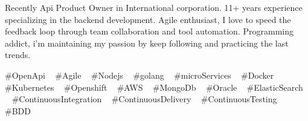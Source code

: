 

\begin{cvparagraph}

Recently Api Product Owner in International corporation. 11+ years experience specializing in the backend development. Agile enthusiast, I love to speed the feedback loop through team collaboration and tool automation. Programming addict, i'm maintaining my passion by keep following and practicing the last trends.
\end{cvparagraph}
\begin{cvtechnologies}
 \#OpenApi ~
 \#Agile ~
 \#Nodejs ~
 \#golang ~
 \#microServices ~
 \#Docker ~
 \#Kubernetes ~
 \#Openshift ~
 \#AWS ~
 \#MongoDb ~
 \#Oracle ~
 \#ElasticSearch ~
 \#ContinuousIntegration ~
 \#ContinuousDelivery ~
 \#ContinuousTesting ~
 \#BDD 
\end{cvtechnologies}
